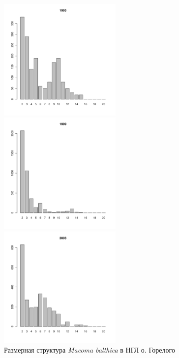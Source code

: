 \begin{figure}[hp]
	\begin{minipage}[b]{.3\linewidth}
	\begin{center}
	\includegraphics[width=60mm]{../White_Sea/Luvenga_Goreliy/midlow2_1995_.pdf}
	\end{center}
	\end{minipage}
	\hfill
	\begin{minipage}[b]{.3\linewidth}
	\begin{center}
	\includegraphics[width=60mm]{../White_Sea/Luvenga_Goreliy/midlow2_1999_.pdf}
	\end{center}
	\end{minipage}
	\hfill
	\begin{minipage}[b]{.3\linewidth}
	\begin{center}
	\includegraphics[width=60mm]{../White_Sea/Luvenga_Goreliy/midlow2_2003_.pdf}
	\end{center}
	\end{minipage}
\caption{Размерная структура {\it Macoma balthica} в НГЛ о. Горелого}
\label{ris:size_str_Goreliy_midlow}
\end{figure}

